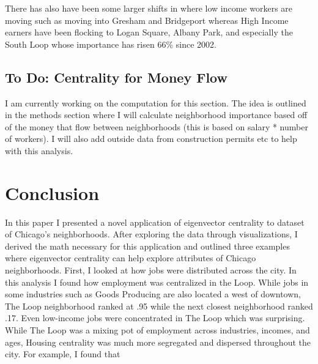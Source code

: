 \documentclass{article}
\theoremstyle{definition}
\theoremstyle{remark}
\begin{document}
There has also have been some larger shifts in where low income workers are moving such as moving into Gresham and Bridgeport whereas High Income earners have been flocking to Logan Square, Albany Park, and especially the South Loop whose importance has risen 66\% since 2002.
\subsection{To Do: Centrality for Money Flow}
I am currently working on the computation for this section.  The idea is outlined in the methods section where I will calculate neighborhood importance based off of the money that flow between neighborhoods (this is based on salary * number of workers).  I will also add outside data from construction permits etc to help with this analysis.\cite{gould1967geographical}
\section{Conclusion}
In this paper I presented a novel application of eigenvector centrality to dataset of Chicago's neighborhoods.  After exploring the data through visualizations, I derived the math necessary for this application and outlined three examples where eigenvector centrality can help explore attributes of Chicago neighborhoods.  First, I looked at how jobs were distributed across the city.  In this analysis I found how employment was centralized in the Loop.  While jobs in some industries such as Goods Producing are also located a west of downtown, The Loop neighborhood ranked at .95 while the next closest neighborhood ranked .17.  Even low-income jobs were concentrated in The Loop which was surprising.  While The Loop was a mixing pot of employment across industries, incomes, and ages, Housing centrality was much more segregated and dispersed throughout the city.  For example, I found that 


\end{document}
